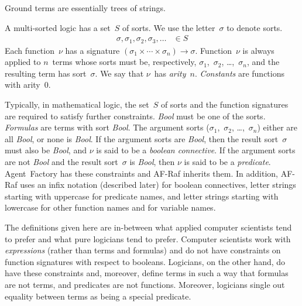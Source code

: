 \documentclass[a4paper,12pt,oneside,fleqn]{book} %
\newcommand{\rg}[1]{\marginpar{\tiny\raggedright\textcolor{blue}{\bf rg:} #1}}
\renewcommand{\rg}{}
\begin{document}
\begin{remark}
Ground terms are essentially trees of strings.
\end{remark}

A multi-sorted logic has a set~$S$ of sorts.  We use the letter~$\sigma$ to
denote sorts.
\begin{align}
\sigma, \sigma_1, \sigma_2, \sigma_3, \ldots &\in S
\end{align}
Each function~$\nu$ has a signature
$(\sigma_1\times\cdots\times\sigma_n)\to\sigma$.  Function~$\nu$ is always
applied to $n$~terms whose sorts must be, respectively,
$\sigma_1$,~$\sigma_2$, \dots,~$\sigma_n$, and the resulting term has
sort~$\sigma$. We say that $\nu$~has \emph{arity}~$n$. \emph{Constants} are
functions with arity~$0$.

Typically, in mathematical logic, the set~$S$ of sorts and the function
signatures are required to satisfy further constraints. \textit{Bool} must
be one of the sorts. \emph{Formulas} are terms with sort \textit{Bool}.
The argument sorts ($\sigma_1$,~$\sigma_2$, \dots,~$\sigma_n$) either are
all \textit{Bool}, or none is \textit{Bool}.  If the argument sorts are
\textit{Bool}, then the result sort~$\sigma$ must also be \textit{Bool},
and $\nu$ is said to be a \emph{boolean connective}.  If the argument sorts
are not \textit{Bool} and the result sort~$\sigma$ is \textit{Bool}, then
$\nu$ is said to be a \emph{predicate}.  Agent~Factory has these
constraints and AF-Raf inherits them. In addition, AF-Raf uses an infix
notation (described later) for boolean connectives, letter strings starting
with uppercase for predicate names, and letter strings starting with
lowercase for other function names and for variable names.

\begin{remark}
The definitions given here are in-between what applied computer scientists
tend to prefer and what pure logicians tend to prefer.  Computer scientists
work with \emph{expressions} (rather than terms and formulas) and do not
have constraints on function signatures with respect to booleans.
Logicians, on the other hand, do have these constraints and, moreover,
define terms in such a way that formulas are not terms, and predicates are
not functions. Moreover, logicians single out equality between terms as
being a special predicate.
\end{remark}

\end{document}
